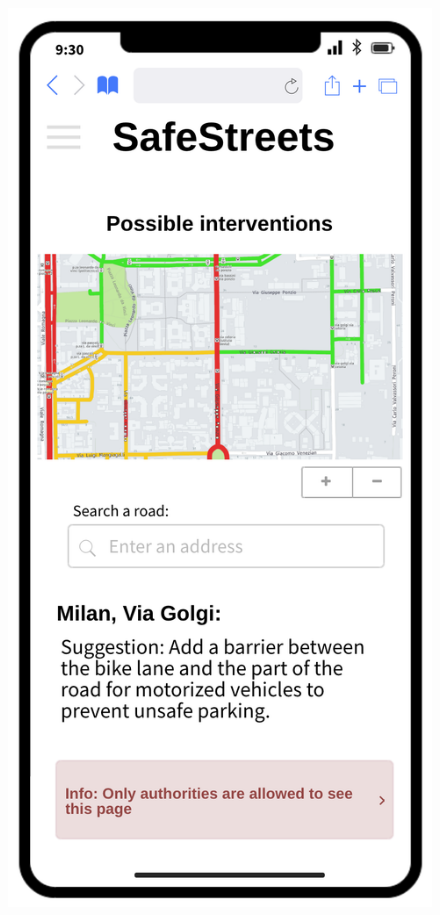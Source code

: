 \begin{figure}[H]
	\centering
	\begin{minipage}[b]{0.40\textwidth}
		\includegraphics[width=\textwidth]{Images/dd-mocks/interventions.png}

\end{minipage}
\end{figure}
